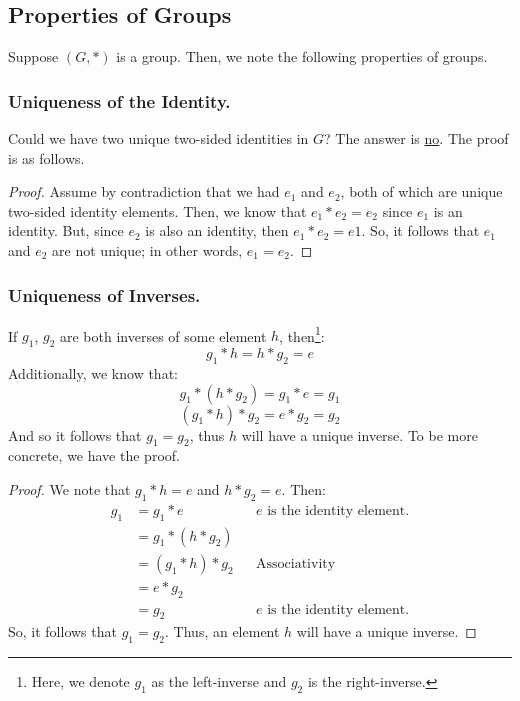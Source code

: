 \documentclass[letterpaper]{article}
\begin{document}
\subsection{Properties of Groups}
Suppose $(G, *)$ is a group. Then, we note the following properties of groups. 

\subsubsection{Uniqueness of the Identity.} 
Could we have two unique two-sided identities in $G$? The answer is \underline{no}. The proof is as follows. 

\begin{mdframed}
    \begin{proof}
        Assume by contradiction that we had $e_1$ and $e_2$, both of which are unique two-sided identity elements. Then, we know that $e_1 * e_2 = e_2$ since $e_1$ is an identity. But, since $e_2$ is also an identity, then $e_1 * e_2 = e1$. So, it follows that $e_1$ and $e_2$ are not unique; in other words, $e_1 = e_2$. 
    \end{proof}
\end{mdframed}

\subsubsection{Uniqueness of Inverses.}

If $g_1$, $g_2$ are both inverses of some element $h$, then\footnote{Here, we denote $g_1$ as the left-inverse and $g_2$ is the right-inverse.}:
\[g_1 * h = h * g_2 = e\]
Additionally, we know that:
\[g_1 * (h * g_2) = g_1 * e = g_1\]
\[(g_1 * h) * g_2 = e * g_2 = g_2\]
And so it follows that $g_1 = g_2$, thus $h$ will have a unique inverse. To be more concrete, we have the proof. 
\begin{mdframed}
    \begin{proof}
        We note that $g_1 * h = e$ and $h * g_2 = e$. Then:
        \begin{equation*}
            \begin{aligned}
                g_1 &= g_1 * e && e \text{ is the identity element.} \\ 
                    &= g_1 * (h * g_2) \\ 
                    &= (g_1 * h) * g_2 && \text{Associativity} \\ 
                    &= e * g_2 \\ 
                    &= g_2 && e \text{ is the identity element.}
            \end{aligned}
        \end{equation*}
        So, it follows that $g_1 = g_2$. Thus, an element $h$ will have a unique inverse. 
    \end{proof}
\end{mdframed}
\end{document}
